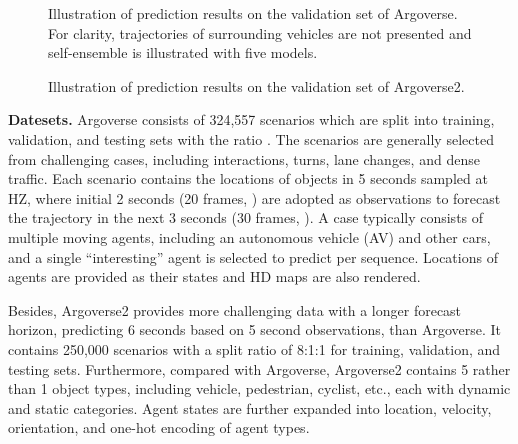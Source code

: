 \documentclass[letterpaper, 10 pt, conference]{ieeeconf}
\begin{document}
\begin{figure*}[tp]
\renewcommand{\baselinestretch}{1.0}
\renewcommand{\abovecaptionskip}{0pt}
\vskip 0.2in
 \caption{Illustration of prediction results on the validation set of Argoverse. 
 For clarity, trajectories of surrounding vehicles are not presented and  self-ensemble is illustrated with five models. } \label{fig.2}
\vskip -0.05in
\end{figure*}

\begin{figure*}
\centering
{}
\hspace{0.25in}
 \caption{Illustration of prediction results on the validation set of Argoverse2. } \label{fig.3}
\vskip -0.15in
\end{figure*} 

\textbf{Datesets.}  Argoverse \cite{chang2019argoverse} consists of 324,557 scenarios which are split into training, validation, and testing sets with the ratio . The scenarios are generally selected from challenging cases, including interactions, turns, lane changes, and  dense traffic. Each scenario contains the locations of objects in 5 seconds  sampled at  HZ, where initial 2 seconds (20 frames, ) are adopted as observations to forecast the trajectory in the next 3 seconds (30 frames, ). A case typically consists of multiple moving agents, including an autonomous vehicle (AV) and other cars, and a single ``interesting'' agent is selected to predict per sequence. Locations of agents are provided as their states  and HD maps are also rendered.
 
Besides, Argoverse2 \cite{wilson2021argoverse} provides more challenging data with a longer forecast horizon, predicting 6 seconds based on 5 second observations, than Argoverse. It contains 250,000 scenarios with a split ratio of 8:1:1 for training, validation, and testing sets. Furthermore, compared with Argoverse, Argoverse2 contains 5 rather than 1 object types, including vehicle, pedestrian, cyclist, etc., each with dynamic and static categories. Agent states are further expanded into location, velocity, orientation, and one-hot encoding of agent types.
\end{document}
